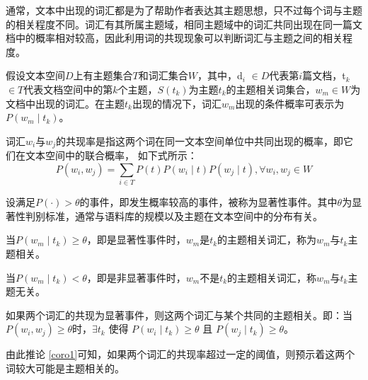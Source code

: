 
通常，文本中出现的词汇都是为了帮助作者表达其主题思想，只不过每个词与主题的相关程度不同。词汇有其所属主题域，相同主题域中的词汇共同出现在同一篇文档中的概率相对较高，因此利用词的共现现象可以判断词汇与主题之间的相关程度。

假设文本空间$D$上有主题集合$T$和词汇集合$W$，其中，d$_i$ $\in D$代表第$i$篇文档，t$_k$ $\in T$代表文档空间中的第$k$个主题，$S(t_k)$为主题$t_k$的主题相关词集合，$w_m \in W$为文档中出现的词汇。在主题$t_k$出现的情况下，词汇$w_m$出现的条件概率可表示为$P(w_m \mid t_k)$。

\begin{definition}[共现率]
词汇$w_i$与$w_j$的共现率是指这两个词在同一文本空间单位中共同出现的概率，即它们在文本空间中的联合概率， \label{def1}如下式所示：
\begin{equation}
P(w_i, w_j) = \sum_{i \in T}P(t) P(w_i \mid t)P(w_j \mid t), \forall w_i, w_j \in W
\label{formula1}
\end{equation} 
\end{definition}


\begin{definition}[显著性事件]
设满足$P(\cdot) > \theta$的事件，即发生概率较高的事件，被称为显著性事件。其中$\theta$为显著性判别标准，通常与语料库的规模以及主题在文本空间中的分布有关。 \label{def2}
\end{definition}

\begin{definition}[主题相关]
当$P(w_m \mid t_k) \geq \theta$，即是显著性事件时，$w_m$是$t_k$的主题相关词汇，称为$w_m$与$t_k$主题相关。
\end{definition} \label{def3}

\begin{definition}[主题无关]
当$P(w_m \mid t_k) < \theta$，即是非显著事件时，$w_m$不是$t_k$的主题相关词汇，称$w_m$与$t_k$主题无关。 \label{def4}
\end{definition}

\begin{corollary}
如果两个词汇的共现为显著事件，则这两个词汇与某个共同的主题相关。即：当$P(w_i, w_j) \geq \theta$时，$\exists t_k$ 使得 $P(w_i \mid t_k) \geq \theta$ 且 $P(w_j \mid t_k) \geq \theta$。 \label{coro1}
\end{corollary}

由此推论 \ref{coro1}可知，如果两个词汇的共现率超过一定的阈值，则预示着这两个词较大可能是主题相关的。
